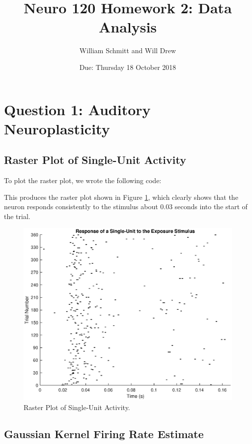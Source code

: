 \documentclass[11pt, oneside]{article}
\title{Neuro 120 Homework 2: Data Analysis}
\author{William Schmitt and Will Drew}
\date{Due: Thursday 18 October 2018}
\begin{document}
\maketitle

\section{Question 1: Auditory Neuroplasticity}

\subsection{Raster Plot of Single-Unit Activity}

To plot the raster plot, we wrote the following code:
 
This produces the raster plot shown in Figure \ref{fig:RasterPlot}, which clearly shows that the neuron responds consistently to the stimulus about 0.03 seconds into the start of the trial.

\begin{figure}[ht!]
\includegraphics[width=1\textwidth]{RasterPlot.eps}
\caption{Raster Plot of Single-Unit Activity.}
\label{fig:RasterPlot}
\end{figure}

\subsection{Gaussian Kernel Firing Rate Estimate}
\end{document}
